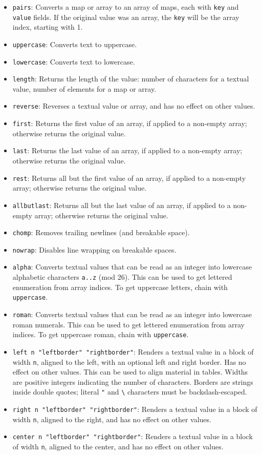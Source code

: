 \documentclass[
]{article}
\begin{document}
\begin{itemize}
\item
  \texttt{pairs}: Converts a map or array to an array of maps, each with
  \texttt{key} and \texttt{value} fields. If the original value was an
  array, the \texttt{key} will be the array index, starting with 1.
\item
  \texttt{uppercase}: Converts text to uppercase.
\item
  \texttt{lowercase}: Converts text to lowercase.
\item
  \texttt{length}: Returns the length of the value: number of characters
  for a textual value, number of elements for a map or array.
\item
  \texttt{reverse}: Reverses a textual value or array, and has no effect
  on other values.
\item
  \texttt{first}: Returns the first value of an array, if applied to a
  non-empty array; otherwise returns the original value.
\item
  \texttt{last}: Returns the last value of an array, if applied to a
  non-empty array; otherwise returns the original value.
\item
  \texttt{rest}: Returns all but the first value of an array, if applied
  to a non-empty array; otherwise returns the original value.
\item
  \texttt{allbutlast}: Returns all but the last value of an array, if
  applied to a non-empty array; otherwise returns the original value.
\item
  \texttt{chomp}: Removes trailing newlines (and breakable space).
\item
  \texttt{nowrap}: Disables line wrapping on breakable spaces.
\item
  \texttt{alpha}: Converts textual values that can be read as an integer
  into lowercase alphabetic characters \texttt{a..z} (mod 26). This can
  be used to get lettered enumeration from array indices. To get
  uppercase letters, chain with \texttt{uppercase}.
\item
  \texttt{roman}: Converts textual values that can be read as an integer
  into lowercase roman numerals. This can be used to get lettered
  enumeration from array indices. To get uppercase roman, chain with
  \texttt{uppercase}.
\item
  \texttt{left\ n\ "leftborder"\ "rightborder"}: Renders a textual value
  in a block of width \texttt{n}, aligned to the left, with an optional
  left and right border. Has no effect on other values. This can be used
  to align material in tables. Widths are positive integers indicating
  the number of characters. Borders are strings inside double quotes;
  literal \texttt{"} and \texttt{\textbackslash{}} characters must be
  backslash-escaped.
\item
  \texttt{right\ n\ "leftborder"\ "rightborder"}: Renders a textual
  value in a block of width \texttt{n}, aligned to the right, and has no
  effect on other values.
\item
  \texttt{center\ n\ "leftborder"\ "rightborder"}: Renders a textual
  value in a block of width \texttt{n}, aligned to the center, and has
  no effect on other values.
\end{itemize}
\end{document}
